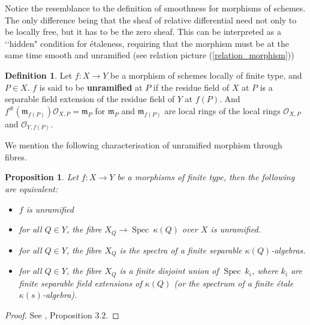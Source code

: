 \documentclass{article}
\theoremstyle{plain}
\newtheorem{proposition}[theorem]{Proposition}
\theoremstyle{definition}
\newtheorem{definition}[theorem]{Definition}
\DeclareMathOperator{\Spec}{Spec}
\begin{document}
\noindent Notice the resemblance to the definition of  smoothness for morphisms of schemes. 
The only difference being that the sheaf of relative differential need not only to be locally free, but it has to be the zero sheaf.
This can be interpreted as a ‘‘hidden" condition for \'etaleness, requiring that the morphism must be at the same time smooth and unramified (see relation picture (\ref{relation_morphism}))


\begin{definition}
    Let $f:X\rightarrow Y$ be a morphism of schemes locally of finite type, and $P\in X$. $f$ is said to be \textbf{unramified} at $P$ if the residue field of $X$ at $P$ is a separable field extension of the residue field of $Y$ at $f(P)$. And $f^{\#}(\mathfrak{m}_{f(P)})\mathcal{O}_{X,P} = \mathfrak{m}_P$ for $\mathfrak{m}_P$ and $\mathfrak{m}_{f(P)}$ are local rings of the local rings $\mathcal{O}_{X,P}$ and $\mathcal{O}_{Y,f(P)}$.
\end{definition}



\noindent We mention the following characterisation of unramified morphism through fibres.
\begin{proposition}
\label{unramified_carac}
    Let $f: X\rightarrow Y$ be a morphisms of finite type, then the following are equivalent:
    \begin{itemize}
        \item[$a)$] $f$ is unramified
        \item[$b)$] for all $Q\in Y$, the fibre $X_Q \rightarrow \Spec\:\kappa(Q)$ over $X$ is unramified.
        \item[$c)$] for all $Q\in Y$, the fibre $X_Q$ is the spectra of a finite separable $\kappa(Q)$-algebras.
        \item[$d)$] for all $Q\in Y$, the fibre $X_Q$ is a finite disjoint union of $\Spec\: k_i$, where $k_i$ are finite separable field extensions of $\kappa(Q)$ (or the spectrum of a finite \'etale $\kappa(s)$-algebra).
    \end{itemize}
\end{proposition}
\begin{proof}
    See \cite{milneEtCoH}, Proposition $3.2$.
\end{proof}
\end{document}
